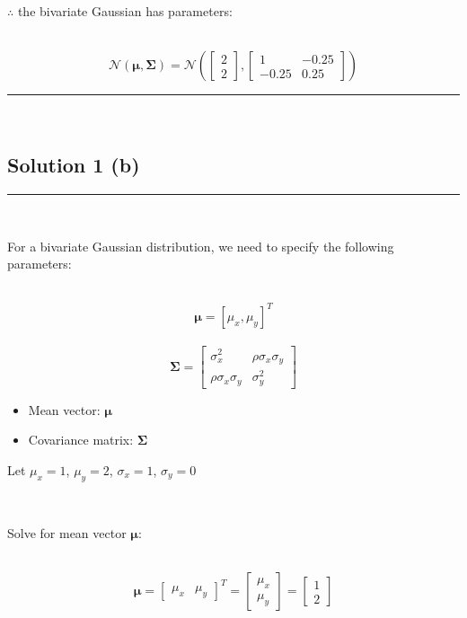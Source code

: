 \documentclass{article}
\begin{document}
\parbox{\textwidth}{$\therefore$ the bivariate Gaussian has parameters:}\\

$$\mathcal{N}(\boldsymbol{\mu},\boldsymbol{\Sigma})=\mathcal{N}\left(\begin{bmatrix} 2 \\ 2 \end{bmatrix}, \begin{bmatrix} 
    1 & -0.25 \\
    -0.25 & 0.25
\end{bmatrix}\right)$$

\noindent\rule{\textwidth}{0.4pt}\\

\newpage

\subsection*{Solution 1 (b)}

\noindent\rule{\textwidth}{0.4pt}\\

\parbox{\textwidth}{For a bivariate Gaussian distribution, we need to specify the following parameters:}\\

$$\boldsymbol{\mu} = [\mu_x, \mu_y]^T$$\\
$$\boldsymbol{\Sigma} = \begin{bmatrix} \sigma_x^2 & \rho\sigma_x\sigma_y \\ \rho\sigma_x\sigma_y & \sigma_y^2 \end{bmatrix}$$

\begin{itemize}
    \item Mean vector: $\boldsymbol{\mu}$
    \item Covariance matrix: $\boldsymbol{\Sigma}$
\end{itemize}

\parbox{\textwidth}{Let $\mu_x = 1$, $\mu_y = 2$, $\sigma_x = 1$, $\sigma_y = 0$}\\

\parbox{\textwidth}{Solve for mean vector $\boldsymbol{\mu}$:}\\

$$\boldsymbol{\mu} = \begin{bmatrix} \mu_x & \mu_y \end{bmatrix}^T = \begin{bmatrix}
    \mu_x \\
    \mu_y
\end{bmatrix} = \begin{bmatrix}
    1 \\
    2
\end{bmatrix}$$\\
\end{document}
